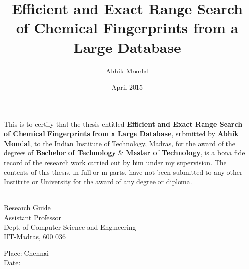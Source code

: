 \documentclass[MTech]{iitmdiss}
\def\thesistitle{Efficient and Exact Range Search of Chemical Fingerprints from a Large Database}
\def\thesisauthor{Abhik Mondal}
\begin{document}


\title{\thesistitle}

\author{\thesisauthor}

\date{April 2015}

\begin{singlespace}
\maketitle 
\end{singlespace} 

\certificate

\vspace*{0.5in}

\noindent This is to certify that the thesis entitled {\bf {\thesistitle}}, 
submitted by {\bf {\thesisauthor}}, to the Indian Institute of Technology, 
Madras, for the award of the degrees of {\bf Bachelor of Technology} \& {\bf Master of Technology}, 
is a bona fide record of the research work carried out by him under my
supervision. The contents of this thesis, in full or in parts, have not been
submitted to any other Institute or University for the award of any degree or
diploma.

\vspace*{1.4in}
\hspace*{-0.25in}
\begin{singlespace}
 \\
\noindent Research Guide \\ 
\noindent Assistant Professor \\
\noindent Dept. of Computer Science and Engineering\\
\noindent IIT-Madras, 600 036 \\
\end{singlespace}
\vspace*{0.20in}
\noindent Place: Chennai\\ 
Date:

\acknowledgements




\pagebreak
\end{document}
